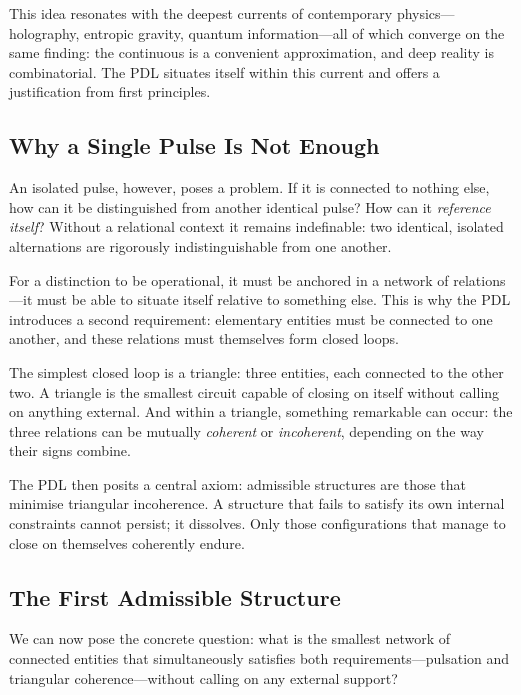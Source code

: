 \documentclass[12pt, a4paper, openright]{book}
\begin{document}
\medskip

This idea resonates with the deepest currents of contemporary physics---holography, entropic gravity, quantum information---all of which converge on the same finding: the continuous is a convenient approximation, and deep reality is combinatorial. The PDL situates itself within this current and offers a justification from first principles.

\subsection*{Why a Single Pulse Is Not Enough}

An isolated pulse, however, poses a problem. If it is connected to nothing else, how can it be distinguished from another identical pulse? How can it \emph{reference itself}? Without a relational context it remains indefinable: two identical, isolated alternations are rigorously indistinguishable from one another.

\medskip

For a distinction to be operational, it must be anchored in a network of relations---it must be able to situate itself relative to something else. This is why the PDL introduces a second requirement: elementary entities must be connected to one another, and these relations must themselves form closed loops.

\medskip

The simplest closed loop is a triangle: three entities, each connected to the other two. A triangle is the smallest circuit capable of closing on itself without calling on anything external. And within a triangle, something remarkable can occur: the three relations can be mutually \emph{coherent} or \emph{incoherent}, depending on the way their signs combine.

\medskip

The PDL then posits a central axiom: admissible structures are those that minimise triangular incoherence. A structure that fails to satisfy its own internal constraints cannot persist; it dissolves. Only those configurations that manage to close on themselves coherently endure.

\subsection*{The First Admissible Structure}

We can now pose the concrete question: what is the smallest network of connected entities that simultaneously satisfies both requirements---pulsation and triangular coherence---without calling on any external support?
\end{document}
